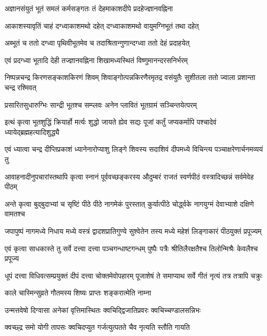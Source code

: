 \twolineshloka
{अज्ञानसंयुतं भूतं समलं कर्मसङ्गतः}
{तं देहमाकाशदीपे प्रदहेज्ज्ञानवह्निना}%

\twolineshloka
{आकाशस्यावृतिं चाहं दग्ध्वाकाशमथो दहेत्}
{दग्ध्वाकाशमथो वायुमग्निभूतं तथा दहेत्}%

\twolineshloka
{अब्भूतं च ततो दग्ध्वा पृथिवीभूतमेव च}
{तदाश्रितान्गुणान्दग्ध्वा ततो देहं प्रदाहयेत्}%

\twolineshloka
{एवं प्रदग्ध्वा भूतादि देही तज्ज्ञानवह्निना}
{शिखामध्यस्थितं विष्णुमानन्दरसनिर्भरम्}%

\twolineshloka
{निष्पन्नचन्द्र किरणसङ्काशकिरणं शिवम्}
{शिवाङ्गोत्पन्नकिरणैरमृतद्र वसंयुतैः}%
सुशीतला ततो ज्वाला प्रशान्ता चन्द्र रश्मिवत्

\twolineshloka
{प्रसारितसुधारुग्भिः सान्द्री भूतश्च सम्प्लवः}
{अनेन प्लावितं भूतग्रामं सञ्चिन्तयेत्परम्}%

\twolineshloka
{इत्थं कृत्वा भूतशुद्धिं क्रियार्हो मर्त्यः शुद्धो जायते ह्येव सद्यः}
{पूजां कर्तुं जप्यकर्मापि पश्चादेवं ध्यायेद्ब्रह्महत्यादिशुद्ध्यै}%

\twolineshloka
{एवं ध्यात्वा चन्द्र दीप्तिप्रकाशं ध्यानेनारोप्याशु लिङ्गे शिवस्य}
{सदाशिवं दीपमध्ये विचिन्त्य पञ्चाक्षरेणार्चनमव्ययं तु}%

\twolineshloka
{आवाहनादीनुपचारांस्तथापि कृत्वा स्नानं पूर्ववच्छङ्करस्य}
{औदुम्बरं राजतं स्वर्णपीठं वस्त्रादिच्छन्नं सर्वमेवेह पीठम्}%

\twolineshloka
{अन्ते कृत्वा बुद्बुदाभ्यां च सृष्टिं पीठे पीठे नागमेकं पुरस्तात्}
{कुर्यात्पीठे चोर्द्ध्वके नागयुग्मं देवाभ्याशे दक्षिणे वामतश्च}%

\twolineshloka
{जपापुष्पं नागमध्ये निधाय मध्ये वस्त्रं द्वादशप्रातिगुण्ये}
{सुश्वेतेन तस्य मध्ये महेशं लिङ्गाकारं पीठयुक्तं प्रपूज्यम्}%

\twolineshloka
{एवं कृत्वा साधकास्ते तु सर्वे दत्त्वा दत्त्वा पञ्चगन्धाष्टगन्धम्}
{पुष्पैः पत्रैः श्रीतिलैरक्षतैश्च तिलोन्मिश्रैः केवलैश्च प्रपूज्य}%

\twolineshloka
{धूपं दत्त्वा विधिवत्सम्प्रयुक्तं दीपं दत्त्वा चोक्तमेवोपहारम्}
{पूजाशेषं ते समाप्याथ सर्वे गीतं नृत्यं तत्र तत्रापि चक्रुः}%

\onelineshloka
{काले चास्मिन्सुव्रते गौतमस्य शिष्यः प्राप्तः शङ्करात्मेति नाम्ना}%

\twolineshloka
{उन्मत्तवेषो दिग्वासा अनेकां वृत्तिमास्थितः}
{क्वचिद्द्विजातिप्रवरः क्वचिच्चण्डालसन्निभः}%

\twolineshloka
{क्वच्छ्द्र समो योगी तापसः क्वचिदप्युत}
{गर्जत्युत्पतते चैव नृत्यति स्तौति गायति}%

